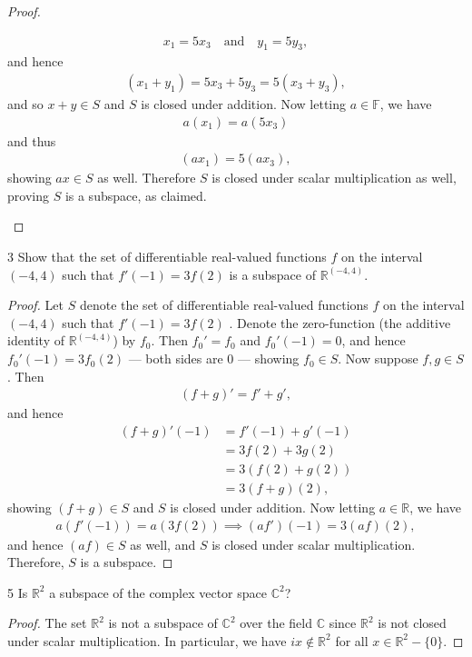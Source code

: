 \documentclass{extarticle}
\newenvironment{problem}[1]{\begin{prob*}{#1}{}}{\end{prob*}}
\newcommand{\R}{\mathbb{R}}
\newcommand{\C}{\mathbb{C}}
\newcommand{\F}{\mathbb{F}}
\begin{document}
\begin{proof}
\begin{enumerate}[(a)]
\begin{align*}
x_1 = 5x_3 ~~~ \text{ and } ~~~ y_1 = 5y_3,
\end{align*}
and hence
\begin{align*}
(x_1 + y_1) = 5x_3 + 5y_3 = 5(x_3 + y_3),
\end{align*}
and so $x+ y\in S$ and $S$ is closed under addition.  Now letting $a\in\F$, we have
\begin{align*}
a(x_1) = a(5x_3) 
\end{align*}  
and thus
\begin{align*}
(ax_1) = 5(ax_3),
\end{align*}
showing $ax\in S$ as well.   Therefore $S$ is closed under scalar multiplication as well, proving $S$ is a subspace, as claimed. \qedhere
\end{enumerate}
\end{proof}

\begin{problem}{3}
Show that the set of differentiable real-valued functions $f$ on the interval $(-4, 4)$ such that $f'(-1) = 3f(2)$ is a subspace of $\R^{(-4, 4)}$.
\end{problem}
\begin{proof}
Let $S$ denote the set of differentiable real-valued functions $f$ on the interval $(-4, 4)$ such that $f'(-1) = 3f(2)$ . Denote the zero-function (the additive identity of $\R^{(-4, 4)}$) by $f_0$.  Then $f_0' = f_0$ and $f_0'(-1) = 0$, and hence $f_0'(-1) = 3f_0(2)$ --- both sides are $0$ --- showing $f_0\in S$.  Now suppose $f,g\in S$.  Then
\begin{align*}
(f+ g)' = f' + g',
\end{align*}
and hence
\begin{align*}
(f+g)'(-1) &= f'(-1) + g'(-1)\\
 &= 3f(2) + 3g(2)\\
 &= 3(f(2) + g(2))\\
 &= 3(f+g)(2),
\end{align*}
showing $(f+g)\in S$ and $S$ is closed under addition.  Now letting $a\in \R$, we have
\begin{align*}
a(f'(-1)) = a(3f(2)) \implies (af')(-1) = 3(af)(2),
\end{align*}
and hence $(af)\in S$ as well, and $S$ is closed under scalar multiplication.  Therefore, $S$ is a subspace.
\end{proof}

\begin{problem}{5}
Is $\R^2$ a subspace of the complex vector space $\C^2$?
\end{problem}
\begin{proof}
The set $\R^2$ is not a subspace of $\C^2$ over the field $\C$ since $\R^2$ is not closed under scalar multiplication.  In particular, we have $ix\not\in\R^2$ for all $x\in\R^2-\{0\}$.
\end{proof}
\end{document}
